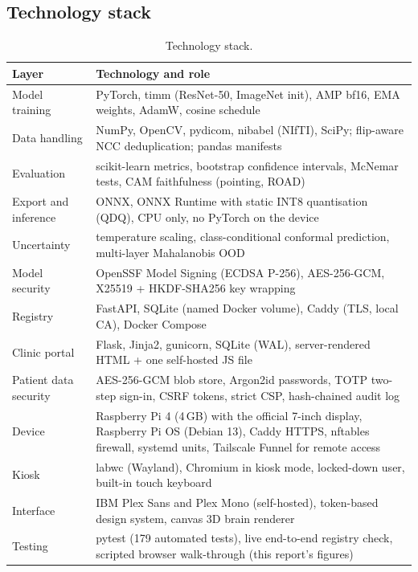 \documentclass[11pt,a4paper]{article}
\begin{document}
\subsection{Technology stack}
\begin{table}[H]\centering\small
\begin{tabularx}{\linewidth}{@{}lX@{}}
\toprule
\textbf{Layer} & \textbf{Technology and role} \\
\midrule
Model training & PyTorch, timm (ResNet-50, ImageNet init), AMP bf16, EMA weights, AdamW, cosine schedule \\
Data handling & NumPy, OpenCV, pydicom, nibabel (NIfTI), SciPy; flip-aware NCC deduplication; pandas manifests \\
Evaluation & scikit-learn metrics, bootstrap confidence intervals, McNemar tests, CAM faithfulness (pointing, ROAD) \\
Export and inference & ONNX, ONNX Runtime with static INT8 quantisation (QDQ), CPU only, no PyTorch on the device \\
Uncertainty & temperature scaling, class-conditional conformal prediction, multi-layer Mahalanobis OOD \\
Model security & OpenSSF Model Signing (ECDSA P-256), AES-256-GCM, X25519 + HKDF-SHA256 key wrapping \\
Registry & FastAPI, SQLite (named Docker volume), Caddy (TLS, local CA), Docker Compose \\
Clinic portal & Flask, Jinja2, gunicorn, SQLite (WAL), server-rendered HTML + one self-hosted JS file \\
Patient data security & AES-256-GCM blob store, Argon2id passwords, TOTP two-step sign-in, CSRF tokens, strict CSP, hash-chained audit log \\
Device & Raspberry Pi 4 (4\,GB) with the official 7-inch display, Raspberry Pi OS (Debian 13), Caddy HTTPS, nftables firewall, systemd units, Tailscale Funnel for remote access \\
Kiosk & labwc (Wayland), Chromium in kiosk mode, locked-down user, built-in touch keyboard \\
Interface & IBM Plex Sans and Plex Mono (self-hosted), token-based design system, canvas 3D brain renderer \\
Testing & pytest (179 automated tests), live end-to-end registry check, scripted browser walk-through (this report's figures) \\
\bottomrule
\end{tabularx}
\caption{Technology stack.}
\end{table}
\end{document}

